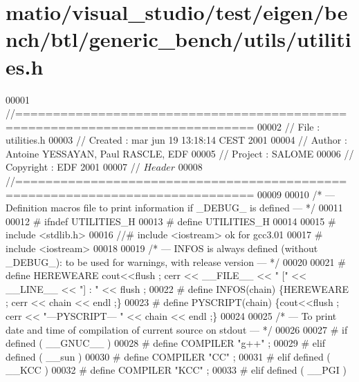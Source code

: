 \hypertarget{matio_2visual__studio_2test_2eigen_2bench_2btl_2generic__bench_2utils_2utilities_8h_source}{}\section{matio/visual\+\_\+studio/test/eigen/bench/btl/generic\+\_\+bench/utils/utilities.h}
\label{matio_2visual__studio_2test_2eigen_2bench_2btl_2generic__bench_2utils_2utilities_8h_source}

\begin{DoxyCode}
00001 \textcolor{comment}{//=============================================================================}
00002 \textcolor{comment}{// File      : utilities.h}
00003 \textcolor{comment}{// Created   : mar jun 19 13:18:14 CEST 2001}
00004 \textcolor{comment}{// Author    : Antoine YESSAYAN, Paul RASCLE, EDF}
00005 \textcolor{comment}{// Project   : SALOME}
00006 \textcolor{comment}{// Copyright : EDF 2001}
00007 \textcolor{comment}{// $Header$}
00008 \textcolor{comment}{//=============================================================================}
00009 
00010 \textcolor{comment}{/* ---  Definition macros file to print information if \_DEBUG\_ is defined --- */}
00011 
00012 \textcolor{preprocessor}{# ifndef UTILITIES\_H}
00013 \textcolor{preprocessor}{# define UTILITIES\_H}
00014 
00015 \textcolor{preprocessor}{# include <stdlib.h>}
00016 \textcolor{comment}{//# include <iostream> ok for gcc3.01}
00017 \textcolor{preprocessor}{# include <iostream>}
00018 
00019 \textcolor{comment}{/* ---  INFOS is always defined (without \_DEBUG\_): to be used for warnings, with release version --- */}
00020 
00021 \textcolor{preprocessor}{# define HEREWEARE cout<<flush ; cerr << \_\_FILE\_\_ << " [" << \_\_LINE\_\_ << "] : " << flush ;}
00022 \textcolor{preprocessor}{# define INFOS(chain) \{HEREWEARE ; cerr << chain << endl ;\}}
00023 \textcolor{preprocessor}{# define PYSCRIPT(chain) \{cout<<flush ; cerr << "---PYSCRIPT--- " << chain << endl ;\}}
00024 
00025 \textcolor{comment}{/* --- To print date and time of compilation of current source on stdout --- */}
00026 
00027 \textcolor{preprocessor}{# if defined ( \_\_GNUC\_\_ )}
00028 \textcolor{preprocessor}{# define COMPILER       "g++" ;}
00029 \textcolor{preprocessor}{# elif defined ( \_\_sun )}
00030 \textcolor{preprocessor}{# define COMPILER       "CC" ;}
00031 \textcolor{preprocessor}{# elif defined ( \_\_KCC )}
00032 \textcolor{preprocessor}{# define COMPILER       "KCC" ;}
00033 \textcolor{preprocessor}{# elif defined ( \_\_PGI )}

\end{DoxyCode}
